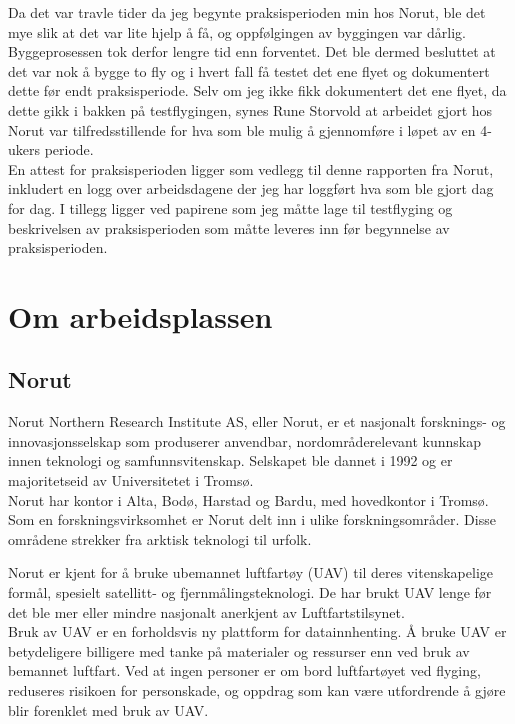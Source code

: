\documentclass[12pt, a4paper]{article}
\begin{document}
Da det var travle tider da jeg begynte praksisperioden min hos Norut, ble det mye slik at det var lite hjelp å få, og oppfølgingen av byggingen var dårlig. Byggeprosessen tok derfor lengre tid enn forventet. Det ble dermed besluttet at det var nok å bygge to fly og i hvert fall få testet det ene flyet og dokumentert dette før endt praksisperiode. Selv om jeg ikke fikk dokumentert det ene flyet, da dette gikk i bakken på testflygingen, synes Rune Storvold at arbeidet gjort hos Norut var tilfredsstillende for hva som ble mulig å gjennomføre i løpet av en 4-ukers periode.\\


En attest for praksisperioden ligger som vedlegg til denne rapporten fra Norut, inkludert en logg over arbeidsdagene der jeg har loggført hva som ble gjort dag for dag. I tillegg ligger ved papirene som jeg måtte lage til testflyging og beskrivelsen av praksisperioden som måtte leveres inn før begynnelse av praksisperioden.


\newpage
\section{Om arbeidsplassen}
\subsection{Norut}
Norut Northern Research Institute AS, eller Norut, er et nasjonalt forsknings- og innovasjonsselskap som produserer anvendbar, nordområderelevant kunnskap innen teknologi og samfunnsvitenskap. Selskapet ble dannet i 1992 og er majoritetseid av Universitetet i Tromsø. \\

Norut har kontor i Alta, Bodø, Harstad og Bardu, med hovedkontor i Tromsø. \\

Som en forskningsvirksomhet er Norut delt inn i ulike forskningsområder. Disse områdene strekker fra arktisk teknologi til urfolk.

Norut er kjent for å bruke ubemannet luftfartøy (UAV) til deres vitenskapelige formål, spesielt satellitt- og fjernmålingsteknologi.  De har brukt UAV lenge før det ble mer eller mindre nasjonalt anerkjent av Luftfartstilsynet.\\

Bruk av UAV er en forholdsvis ny plattform for datainnhenting. Å bruke UAV er betydeligere billigere med tanke på materialer og ressurser enn ved bruk av bemannet luftfart. Ved at ingen personer er om bord luftfartøyet ved flyging, reduseres risikoen for personskade, og oppdrag som kan være utfordrende å gjøre blir forenklet med bruk av UAV. \\
\end{document}

